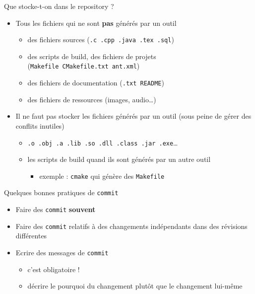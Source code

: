 \begin{frame}[fragile]{%
\protect\hypertarget{que-stocke-t-on-dans-le-repository}{%
Que stocke-t-on dans le repository ?}}

\begin{itemize}
\tightlist
\item
  Tous les fichiers qui ne sont \alert{\textbf{pas}} générés par un outil

  \begin{itemize}
  \tightlist
  \item
    des fichiers sources (\texttt{.c\ .cpp\ .java\ .tex\ .sql})
  \item
    des scripts de build, des fichiers de projets
    (\texttt{Makefile\ CMakefile.txt\ ant.xml})
  \item
    des fichiers de documentation (\texttt{.txt\ README})
  \item
    des fichiers de ressources (images, audio\ldots{})
  \end{itemize}
\item
  Il ne faut pas stocker les fichiers générés par un outil (sous peine de gérer des
  conflits inutiles)

  \begin{itemize}
  \tightlist
  \item
    \texttt{.o\ .obj\ .a\ .lib\ .so\ .dll\ .class\ .jar\ .exe}\ldots{}
  \item
    les scripts de build quand ils sont générés par un autre outil

    \begin{itemize}
    \tightlist
    \item
      exemple : \texttt{cmake} qui génère des \texttt{Makefile}
    \end{itemize}
  \end{itemize}
\end{itemize}

\end{frame}

\begin{frame}[fragile]{%
\protect\hypertarget{quelques-bonnes-pratiques-de-commit}{%
Quelques bonnes pratiques de \texttt{commit}}}

\begin{itemize}
\tightlist
\item
  Faire des \texttt{commit} \textbf{souvent}
\item
  Faire des \texttt{commit} relatifs à des changements indépendants dans
  des révisions différentes
\item
  Ecrire des messages de \texttt{commit}

  \begin{itemize}
  \tightlist
  \item
    \alert{c’est obligatoire !}
  \item
    décrire le pourquoi du changement plutôt que le changement lui-même
  \end{itemize}
\end{itemize}

\end{frame}

